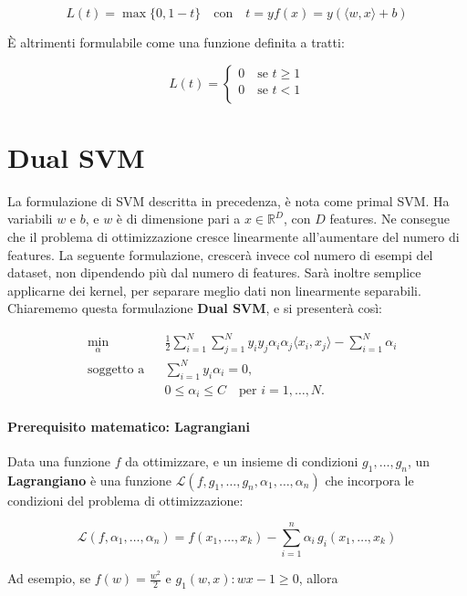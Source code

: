 $$
L(t) = \max\{0, 1-t\}\quad \text{con} \quad t = yf(x)= y(\langle w, x \rangle + b)
$$

È altrimenti formulabile come una funzione definita a tratti:

$$
L(t) = \begin{cases}
0 \quad \text{se } t\geq 1\\
0 \quad \text{se } t < 1\\
\end{cases}
$$

\newpage

\section{Dual SVM}
La formulazione di SVM descritta in precedenza, è nota come primal SVM. Ha variabili $w$ e $b$, e $w$ è di dimensione pari a $x \in \mathbb{R}^D$, con $D$ features. Ne consegue che il problema di ottimizzazione cresce linearmente all'aumentare del numero di features. La seguente formulazione, crescerà invece col numero di esempi del dataset, non dipendendo più dal numero di features. Sarà inoltre semplice applicarne dei kernel, per separare meglio dati non linearmente separabili. Chiarememo questa formulazione \textbf{Dual SVM}, e si presenterà così:

$$
\begin{aligned}
	&\min_{\alpha} && 
	\frac{1}{2} \sum_{i=1}^{N} \sum_{j=1}^{N} 
	y_i y_j \alpha_i \alpha_j \langle x_i, x_j \rangle
	- \sum_{i=1}^{N} \alpha_i \\
	&\text{soggetto a} && 
	\sum_{i=1}^{N} y_i \alpha_i = 0, \\
	& && 0 \le \alpha_i \le C \quad \text{per } i = 1,\dots, N .
\end{aligned}
$$

\paragraph{Prerequisito matematico: Lagrangiani}
Data una funzione $f$ da ottimizzare, e un insieme di condizioni $g_1, \dots, g_n$, un \textbf{Lagrangiano} è una funzione $\mathcal{L}(f,g_1, \dots, g_n, \alpha_1, \dots, \alpha_n)$ che incorpora le condizioni del problema di ottimizzazione:

$$
\mathcal{L}(f,\alpha_1,\ldots,\alpha_n)
= f(x_1,\ldots,x_k) - \sum_{i=1}^{n} \alpha_i\, g_i(x_1,\ldots,x_k)
$$

Ad esempio, se $f(w) = \displaystyle\frac{w^2}{2}$ e $\displaystyle g_1(w,x) : wx-1 \geq 0$, allora

